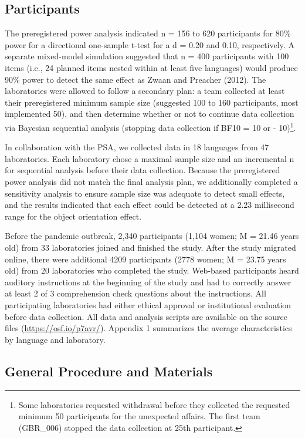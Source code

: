 \documentclass[
  man,floatsintext]{apa6}
\begin{document}
\hypertarget{participants}{%
\subsection{Participants}\label{participants}}

The preregistered power analysis indicated n = 156 to 620 participants for 80\% power for a directional one-sample t-test for a d = 0.20 and 0.10, respectively. A separate mixed-model simulation suggested that n = 400 participants with 100 items (i.e., 24 planned items nested within at least five languages) would produce 90\% power to detect the same effect as Zwaan and Preacher (2012). The laboratories were allowed to follow a secondary plan: a team collected at least their preregistered minimum sample size (suggested 100 to 160 participants, most implemented 50), and then determine whether or not to continue data collection via Bayesian sequential analysis (stopping data collection if BF10 = 10 or - 10)\footnote{Some laboratories requested withdrawal before they collected the requested minimum 50 participants for the unexpected affairs. The first team (GBR\_006) stopped the data collection at 25th participant.}.

In collaboration with the PSA, we collected data in 18 languages from 47 laboratories. Each laboratory chose a maximal sample size and an incremental n for sequential analysis before their data collection. Because the preregistered power analysis did not match the final analysis plan, we additionally completed a sensitivity analysis to ensure sample size was adequate to detect small effects, and the results indicated that each effect could be detected at a 2.23 millisecond range for the object orientation effect.

Before the pandemic outbreak, 2,340 participants (1,104 women; M = 21.46 years old) from 33 laboratories joined and finished the study. After the study migrated online, there were additional 4209 participants (2778 women; M = 23.75 years old) from 20 laboratories who completed the study. Web-based participants heard auditory instructions at the beginning of the study and had to correctly answer at least 2 of 3 comprehension check questions about the instructions. All participating laboratories had either ethical approval or institutional evaluation before data collection. All data and analysis scripts are available on the source files (\url{https://osf.io/p7avr/}). Appendix 1 summarizes the average characteristics by language and laboratory.

\hypertarget{general-procedure-and-materials}{%
\subsection{General Procedure and Materials}\label{general-procedure-and-materials}}
\end{document}
